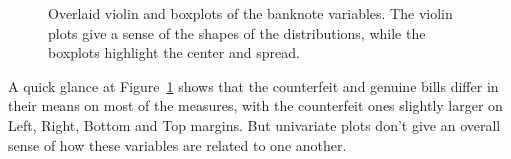 \documentclass[
  letterpaper,
  10pt,
  krantz2]{krantz}
\begin{document}
\begin{figure}[H]


\caption{\label{fig-banknote-violin}Overlaid violin and boxplots of the
banknote variables. The violin plots give a sense of the shapes of the
distributions, while the boxplots highlight the center and spread.}

\end{figure}%

A quick glance at Figure~\ref{fig-banknote-violin} shows that the
counterfeit and genuine bills differ in their means on most of the
measures, with the counterfeit ones slightly larger on Left, Right,
Bottom and Top margins. But univariate plots don't give an overall sense
of how these variables are related to one another.
\end{document}
